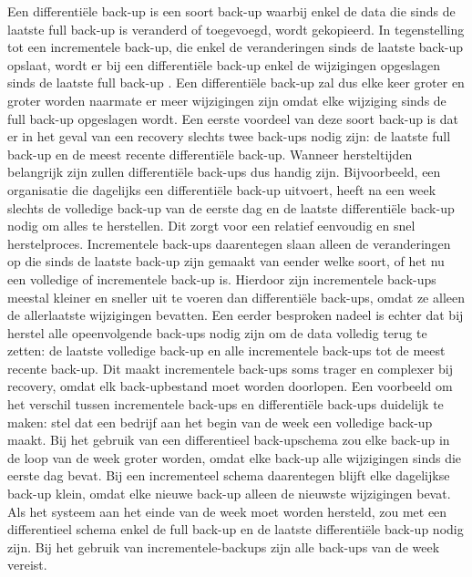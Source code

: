 Een differentiële back-up is een soort back-up waarbij enkel de data die sinds de laatste full back-up is veranderd of toegevoegd, wordt gekopieerd. In tegenstelling tot een incrementele back-up, die enkel de veranderingen sinds de laatste back-up opslaat, wordt er bij een differentiële back-up enkel de wijzigingen opgeslagen sinds de laatste full back-up \autocite{Zhu2015}. Een differentiële back-up zal dus elke keer groter en groter worden naarmate er meer wijzigingen zijn omdat elke wijziging sinds de full back-up opgeslagen wordt. Een eerste voordeel van deze soort back-up is dat er in het geval van een recovery slechts twee back-ups nodig zijn: de laatste full back-up en de meest recente differentiële back-up. Wanneer hersteltijden belangrijk zijn zullen differentiële back-ups dus handig zijn. Bijvoorbeeld, een organisatie die dagelijks een differentiële back-up uitvoert, heeft na een week slechts de volledige back-up van de eerste dag en de laatste differentiële back-up nodig om alles te herstellen. Dit zorgt voor een relatief eenvoudig en snel herstelproces. Incrementele back-ups daarentegen slaan alleen de veranderingen op die sinds de laatste back-up zijn gemaakt van eender welke soort, of het nu een volledige of incrementele back-up is. Hierdoor zijn incrementele back-ups meestal kleiner en sneller uit te voeren dan differentiële back-ups, omdat ze alleen de allerlaatste wijzigingen bevatten. Een eerder besproken nadeel is echter dat bij herstel alle opeenvolgende back-ups nodig zijn om de data volledig terug te zetten: de laatste volledige back-up en alle incrementele back-ups tot de meest recente back-up. Dit maakt incrementele back-ups soms trager en complexer bij recovery, omdat elk back-upbestand moet worden doorlopen. Een voorbeeld om het verschil tussen incrementele back-ups en differentiële back-ups duidelijk te maken: stel dat een bedrijf aan het begin van de week een volledige back-up maakt. Bij het gebruik van een differentieel back-upschema zou elke back-up in de loop van de week groter worden, omdat elke back-up alle wijzigingen sinds die eerste dag bevat. Bij een incrementeel schema daarentegen blijft elke dagelijkse back-up klein, omdat elke nieuwe back-up alleen de nieuwste wijzigingen bevat. Als het systeem aan het einde van de week moet worden hersteld, zou met een differentieel schema enkel de full back-up en de laatste differentiële back-up nodig zijn. Bij het gebruik van incrementele-backups zijn alle back-ups van de week vereist.\autocite{Beard2018}

